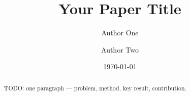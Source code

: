 \documentclass[11pt,a4paper]{article}
\title{Your Paper Title}
\author{Author One \and Author Two}
\date{\today}
\begin{document}
\maketitle

\begin{abstract}
TODO: one paragraph — problem, method, key result, contribution.
\end{abstract}








\printbibliography
\end{document}
